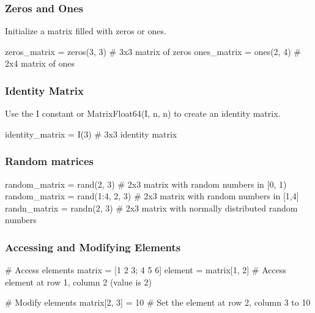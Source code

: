 \documentclass{report}
\begin{document}
     \bigbreak \noindent 
     \subsubsection{Zeros and Ones}
     \bigbreak \noindent 
     Initialize a matrix filled with zeros or ones.
     \bigbreak \noindent 
     \begin{jlcode}
         zeros_matrix = zeros(3, 3)  # 3x3 matrix of zeros
         ones_matrix = ones(2, 4)    # 2x4 matrix of ones
     \end{jlcode}
     \bigbreak \noindent 
     \subsubsection{Identity Matrix}
     \bigbreak \noindent 
     Use the I constant or Matrix{Float64}(I, n, n) to create an identity matrix.
     \bigbreak \noindent 
     \begin{jlcode}
     identity_matrix = I(3)  # 3x3 identity matrix
     \end{jlcode}
     \bigbreak \noindent 
     \subsubsection{Random matrices}
     \bigbreak \noindent 
     \begin{cppcode}
         random_matrix = rand(2, 3)      # 2x3 matrix with random numbers in [0, 1)
         random_matrix = rand(1:4, 2, 3)      # 2x3 matrix with random numbers in [1,4] 
         randn_matrix = randn(2, 3)      # 2x3 matrix with normally distributed random numbers
     \end{cppcode}
     \bigbreak \noindent 
     \subsubsection{Accessing and Modifying Elements }
     \bigbreak \noindent 
     \begin{jlcode}
         # Access elements
         matrix = [1 2 3; 4 5 6]
         element = matrix[1, 2]  # Access element at row 1, column 2 (value is 2)

         # Modify elements
         matrix[2, 3] = 10       # Set the element at row 2, column 3 to 10
     \end{jlcode}
     \bigbreak \noindent 
\end{document}
